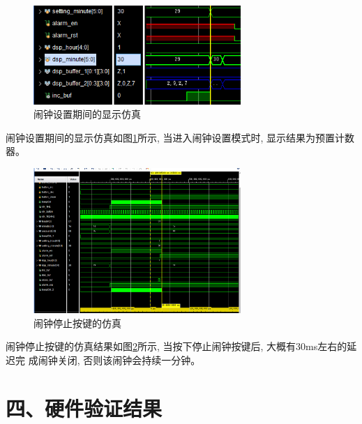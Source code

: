 \documentclass{article}
\newcommand{\fourhao}{\fontsize{14pt}{\baselineskip}\selectfont} %
\newcommand{\xiaosihao}{\fontsize{12pt}{\baselineskip}\selectfont} %
\begin{document}
\begin{figure}[htbp]
    \centering
    \includegraphics[width=0.7\textwidth]{image/2024-06-25-22-13-26.png}
    \caption{闹钟设置期间的显示仿真}
    \label{image_alarm_sim_3}
\end{figure}
闹钟设置期间的显示仿真如图\ref{image_alarm_sim_3}所示, 当进入闹钟设置模式时, 显示结果为预置计数器。\\
\begin{figure}[H]
    \centering
    \includegraphics[width=0.7\textwidth]{image/2024-06-25-22-16-52.png}
    \caption{闹钟停止按键的仿真}
    \label{image_alarm_sim_4}
\end{figure}
闹钟停止按键的仿真结果如图\ref{image_alarm_sim_4}所示, 当按下停止闹钟按键后, 大概有30ms左右的延迟完
成闹钟关闭, 否则该闹钟会持续一分钟。\\
\section*{\fourhao 四、硬件验证结果}
\xiaosihao
{}
\end{document}
